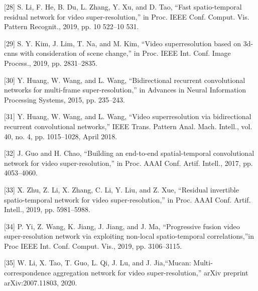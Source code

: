 \documentclass[11pt,UTF8]{ctexart}
\begin{document}
[28] S. Li, F. He, B. Du, L. Zhang, Y. Xu, and D. Tao, “Fast spatio-temporal residual network for video super-resolution,” in Proc. IEEE Conf. Comput. Vis. Pattern Recognit., 2019, pp. 10 522–10 531.

[29] S. Y. Kim, J. Lim, T. Na, and M. Kim, “Video superresolution based on 3d-cnns with consideration of scene change,” in Proc. IEEE Int. Conf. Image Process., 2019, pp. 2831–2835.

[30] Y. Huang, W. Wang, and L. Wang, “Bidirectional recurrent convolutional networks for multi-frame super-resolution,” in Advances in Neural Information Processing Systems, 2015, pp. 235–243.

[31] Y. Huang, W. Wang, and L. Wang, “Video superresolution via bidirectional recurrent convolutional networks,” IEEE Trans. Pattern Anal. Mach. Intell., vol. 40, no. 4, pp. 1015–1028, April 2018.

[32] J. Guo and H. Chao, “Building an end-to-end spatial-temporal convolutional network for video super-resolution,” in Proc. AAAI Conf. Artif. Intell., 2017, pp. 4053–4060.

[33] X. Zhu, Z. Li, X. Zhang, C. Li, Y. Liu, and Z. Xue, “Residual invertible spatio-temporal network for video super-resolution,” in Proc. AAAI Conf. Artif. Intell., 2019, pp. 5981–5988.

[34] P. Yi, Z. Wang, K. Jiang, J. Jiang, and J. Ma, “Progressive fusion video super-resolution network via exploiting non-local spatio-temporal correlations,”in Proc IEEE Int. Conf. Comput. Vis., 2019, pp. 3106–3115.

[35] W. Li, X. Tao, T. Guo, L. Qi, J. Lu, and J. Jia,“Mucan: Multi-correspondence aggregation network for video super-resolution,” arXiv preprint arXiv:2007.11803, 2020.




\clearpage
\end{document}
